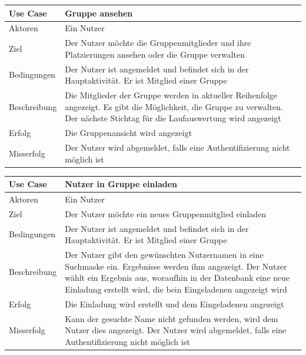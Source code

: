 \begin{tabular}{|p{}|p{}|}
\hline
\textbf{Use Case} & \textbf{Gruppe ansehen} \\ \hline \hline
Aktoren &  Ein Nutzer \\ \hline
Ziel &  Der Nutzer möchte die Gruppenmitglieder und ihre Platzierungen ansehen oder die Gruppe verwalten \\ \hline
Bedingungen &  Der Nutzer ist angemeldet und befindet sich in der Hauptaktivität. Er ist Mitglied einer Gruppe \\ \hline
Beschreibung & Die Mitglieder der Gruppe werden in aktueller Reihenfolge angezeigt. Es gibt die Möglichkeit, die Gruppe zu verwalten. Der nächste Stichtag für die Laufauswertung wird angezeigt \\ \hline
Erfolg & Die Gruppenansicht wird angezeigt \\ \hline
Misserfolg & Der Nutzer wird abgemeldet, falls eine Authentifizierung nicht möglich ist \\ \hline
\hline \end{tabular}
\begin{tabular}{|p{}|p{}|}
\hline
\textbf{Use Case} & \textbf{Nutzer in Gruppe einladen} \\ \hline \hline
Aktoren &  Ein Nutzer \\ \hline
Ziel &  Der Nutzer möchte ein neues Gruppenmitglied einladen \\ \hline
Bedingungen &  Der Nutzer ist angemeldet und befindet sich in der Hauptaktivität. Er ist Mitglied einer Gruppe \\ \hline
Beschreibung & Der Nutzer gibt den gewünschten Nutzernamen in eine Suchmaske ein. Ergebnisse werden ihm angezeigt. Der Nutzer wählt ein Ergebnis aus, woraufhin in der Datenbank eine neue Einladung erstellt wird, die bein Eingeladenen angezeigt wird \\ \hline
Erfolg & Die Einladung wird erstellt und dem Eingeladenen angezeigt \\ \hline
Misserfolg & Kann der gesuchte Name nicht gefunden werden, wird dem Nutzer dies angezeigt. Der Nutzer wird abgemeldet, falls eine Authentifizierung nicht möglich ist \\ \hline
\hline \end{tabular}
